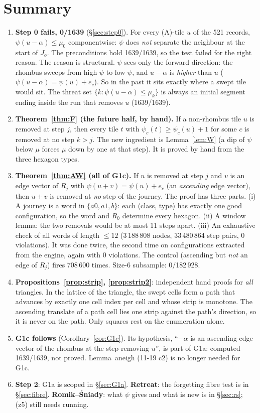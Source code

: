 \documentclass[11pt]{article}
\theoremstyle{definition}\newtheorem{definition}[theorem]{Definition}\newtheorem{remark}[theorem]{Remark}
\begin{document}
\section*{Summary}
\begin{enumerate}
\item \textbf{Step 0 fails, 0/1639} (\S\ref{sec:step0}). For every (A)-tile $u$ of the 521 records, $\psi(u-\alpha)\le\mu_0$ componentwise: $\psi$ does \emph{not} separate the neighbour at the start of $J_o$. The preconditions hold 1639/1639, so the test failed for the right reason.
The reason is structural. $\psi$ sees only the forward direction: the rhombus sweeps from high $\psi$ to low $\psi$, and $u-\alpha$ is \emph{higher} than $u$ ($\psi(u-\alpha)=\psi(u)+e_c$). So in the past it sits exactly where a swept tile would sit. The threat set $\{k:\psi(u-\alpha)\le\mu_k\}$ is always an initial segment ending inside the run that removes $u$ (1639/1639).
\item \textbf{Theorem~\ref{thm:F} (the future half, by hand).} If a non-rhombus tile $u$ is removed at step $j$, then every tile $t$ with $\psi_c(t)\ge\psi_c(u)+1$ for some $c$ is removed at no step $k>j$. The new ingredient is Lemma~\ref{lem:W} (a dip of $\psi$ below $\mu$ forces $\mu$ down by one at that step). It is proved by hand from the three hexagon types.
\item \textbf{Theorem~\ref{thm:AW} (all of G1c).} If $u$ is removed at step $j$ and $v$ is an edge vector of $R_j$ with $\psi(u+v)=\psi(u)+e_c$ (an \emph{ascending} edge vector), then $u+v$ is removed at \emph{no} step of the journey.
The proof has three parts. (i) A journey is a word in $\{a0,a1,b\}$: each (class, type) has exactly one good configuration, so the word and $R_0$ determine every hexagon. (ii) A window lemma: the two removals would be at most 11 steps apart. (iii) An exhaustive check of all words of length $\le12$ (3\,188\,808 nodes, 33\,480\,864 step pairs, 0 violations). It was done twice, the second time on configurations extracted from the engine, again with 0 violations. The control (ascending but \emph{not} an edge of $R_j$) fires 708\,600 times. Size-6 subsample: 0/182\,928.
\item \textbf{Propositions~\ref{prop:strip}, \ref{prop:strip2}}: independent hand proofs for \emph{all} triangles. In the lattice of the triangle, the swept cells form a path that advances by exactly one cell index per cell and whose strip is monotone. The ascending translate of a path cell lies one strip against the path's direction, so it is never on the path. Only squares rest on the enumeration alone.
\item \textbf{G1c follows} (Corollary~\ref{cor:G1c}). Its hypothesis, ``$-\alpha$ is an ascending edge vector of the rhombus at the step removing $u$'', is part of G1a: computed 1639/1639, not proved. Lemma~aneigh (11-19 c2) is no longer needed for G1c.
\item \textbf{Step 2}: G1a is scoped in \S\ref{sec:G1a}. \textbf{Retreat}: the forgetting fibre test is in \S\ref{sec:fibre}. \textbf{Romik--\'Sniady}: what $\psi$ gives and what is new is in \S\ref{sec:rs}; (z5) still needs running.
\end{enumerate}
\end{document}
